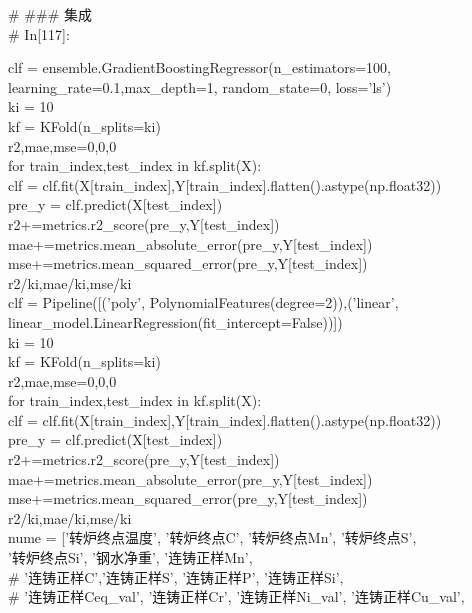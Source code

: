 \documentclass{xcumcmart}
\begin{document}
\noindent
\# \#\#\# 集成  \\

\# In[117]:  \\
\noindent

clf = ensemble.GradientBoostingRegressor(n\_estimators=100, learning\_rate=0.1,max\_depth=1, random\_state=0, loss='ls')  \\
ki = 10  \\
kf = KFold(n\_splits=ki)  \\
r2,mae,mse=0,0,0  \\
for train\_index,test\_index in kf.split(X):  \\
    clf = clf.fit(X[train\_index],Y[train\_index].flatten().astype(np.float32))  \\
    pre\_y = clf.predict(X[test\_index])  \\
    r2+=metrics.r2\_score(pre\_y,Y[test\_index])  \\
    mae+=metrics.mean\_absolute\_error(pre\_y,Y[test\_index])  \\
    mse+=metrics.mean\_squared\_error(pre\_y,Y[test\_index])  \\
r2/ki,mae/ki,mse/ki  \\
clf = Pipeline([('poly', PolynomialFeatures(degree=2)),('linear', linear\_model.LinearRegression(fit\_intercept=False))])  \\
ki = 10  \\
kf = KFold(n\_splits=ki)  \\
r2,mae,mse=0,0,0  \\
for train\_index,test\_index in kf.split(X):  \\
    clf = clf.fit(X[train\_index],Y[train\_index].flatten().astype(np.float32))  \\
    pre\_y = clf.predict(X[test\_index])  \\
    r2+=metrics.r2\_score(pre\_y,Y[test\_index])  \\
    mae+=metrics.mean\_absolute\_error(pre\_y,Y[test\_index])  \\
    mse+=metrics.mean\_squared\_error(pre\_y,Y[test\_index])  \\
r2/ki,mae/ki,mse/ki  \\
nume = ['转炉终点温度', '转炉终点C', '转炉终点Mn', '转炉终点S',  \\
       '转炉终点Si', '钢水净重', '连铸正样Mn',   \\
\#         '连铸正样C','连铸正样S', '连铸正样P', '连铸正样Si',  \\
\#        '连铸正样Ceq\_val', '连铸正样Cr', '连铸正样Ni\_val', '连铸正样Cu\_val',  \\
\end{document}
